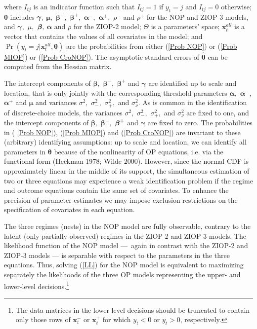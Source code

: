 \documentclass[letterpaper,fleqn,12pt]{article}
\begin{document}
\noindent where $I_{tj}$ is an indicator function such that $I_{tj}=1$ if $%
y_{t}=j$ and $I_{tj}=0$ otherwise; $\mathbf{\theta }$ includes $\mathbf{%
\gamma ,}$ $\mathbf{\mu ,}$ $\mathbf{\beta }^{-},$ $\mathbf{\beta }^{+},$ $%
\mathbf{\alpha }^{-},$ $\mathbf{\alpha }^{+},$ $\rho ^{-}$ and $\rho ^{+}$
for the NOP and ZIOP-3 models, and $\mathbf{\gamma },$ $\mu ,$ $\mathbf{%
\beta },$ $\mathbf{\alpha }$ and $\rho $ for the ZIOP-2 model; $\Theta $ is
a parameters' space; $\mathbf{x}_{t}^{all}$ is a vector that contains the
values of all covariates in the model; and $\Pr (y_{t}=j|\mathbf{x}%
_{t}^{all},\mathbf{\theta })$ are the probabilities from either (\ref{Prob
NOP}) or (\ref{Prob MIOP}) or (\ref{Prob CroNOP}). The asymptotic standard
errors of $\widehat{\mathbf{\theta }}$ can be computed from the Hessian
matrix.

The intercept components of $\mathbf{\beta ,}$ $\mathbf{\beta }^{-},$ $%
\mathbf{\beta }^{+}$ and $\mathbf{\gamma }$ are identified up to scale and
location, that is only jointly with the corresponding threshold parameters $%
\mathbf{\alpha ,}$ $\mathbf{\alpha }^{-}\mathbf{,}$ $\mathbf{\alpha }^{+}$
and $\mathbf{\mu }$ and variances $\sigma ^{2},$ $\sigma _{-}^{2},$ $\sigma
_{+}^{2},$ and $\sigma _{\nu }^{2}$. As is common in the identification of
discrete-choice models, the variances $\sigma ^{2},$ $\sigma _{-}^{2},$ $%
\sigma _{+}^{2},$ and $\sigma _{\nu }^{2}$ are fixed to one, and the
intercept components of $\mathbf{\beta ,}$ $\mathbf{\beta }^{-},$ $\mathbf{%
\beta }^{+}$ and $\mathbf{\gamma }$ are fixed to zero. The probabilities in (%
\ref{Prob NOP}), (\ref{Prob MIOP}) and (\ref{Prob CroNOP}) are invariant to
these (arbitrary) identifying assumptions: up to scale and location, we can
identify all parameters in $\mathbf{\theta }$ because of the nonlinearity of
OP equations, i.e. via the functional form (Heckman 1978; Wilde 2000).
However, since the normal CDF is approximately linear in the middle of its
support, the simultaneous estimation of two or three equations may
experience a weak identification problem if the regime and outcome equations
contain the same set of covariates. To enhance the precision of parameter
estimates we may impose exclusion restrictions on the specification of
covariates in each equation.

The three regimes (nests) in the NOP model are fully observable, contrary to
the latent (only partially observed) regimes in the ZIOP-2 and ZIOP-3
models. The likelihood function of the NOP model ---\ again in contrast with
the ZIOP-2 and ZIOP-3 models --- is separable with respect to the parameters
in the three equations. Thus, solving (\ref{LL}) for the NOP model is
equivalent to maximizing separately the likelihoods of the three OP models
representing the upper- and lower-level decisions.\footnote{%
The data matrices in the lower-level decisions should be truncated to
contain only those rows of $\mathbf{x}_{t}^{-}$ or $\mathbf{x}_{t}^{+}$ for
which $y_{t}<0$ or $y_{t}>0$, respectively.}
\end{document}
